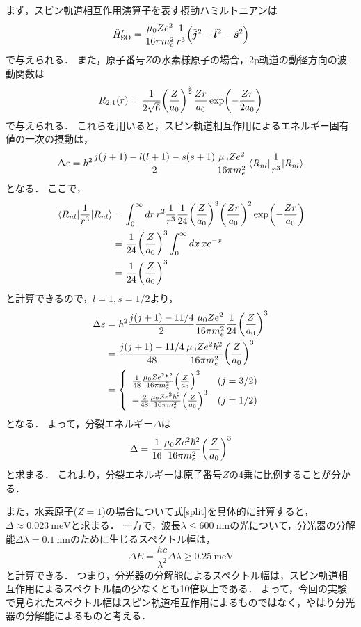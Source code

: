 \documentclass[titlepage]{jsarticle}
\begin{document}
まず，スピン軌道相互作用演算子を表す摂動ハミルトニアンは
\begin{equation}
  \hat{H}'_{\mathrm{SO}} = \frac{\mu_0 Z e^2}{16\pi m_e^2}\frac{1}{r^3} \qty(\hat{\bm{j}}^2 - \hat{\bm{l}}^2 - \hat{\bm{s}}^2)
\end{equation}
で与えられる．
また，原子番号$Z$の水素様原子の場合，2p軌道の動径方向の波動関数は
\begin{equation}
  R_{2,1}(r) = \frac{1}{2\sqrt{6}} \qty(\frac{Z}{a_0})^{\frac{3}{2}} \frac{Zr}{a_0} \exp(-\frac{Zr}{2a_0})
\end{equation}
で与えられる．
これらを用いると，スピン軌道相互作用によるエネルギー固有値の一次の摂動は，
\begin{equation}
  \Delta \varepsilon = \hbar^2 \frac{j(j+1) - l(l+1) - s(s+1)}{2} \frac{\mu_0 Z e^2}{16\pi m_e^2} \expval{\frac{1}{r^3}}{R_{nl}}
\end{equation}
となる．
ここで，
\begin{align}
  \expval{\frac{1}{r^3}}{R_{nl}} &= \int_0^\infty dr\, r^2 \frac{1}{r^3} \frac{1}{24} \qty(\frac{Z}{a_0})^3 \qty(\frac{Zr}{a_0})^2 \exp(-\frac{Zr}{a_0})\notag\\
  &= \frac{1}{24} \qty(\frac{Z}{a_0})^3 \int_0^\infty dx\, x e^{-x} \notag\\
  &= \frac{1}{24} \qty(\frac{Z}{a_0})^3 
\end{align}
と計算できるので，$l=1,s=1/2$より，
\begin{align}
  \Delta \varepsilon &= \hbar^2 \frac{j(j+1) - 11/4}{2} \frac{\mu_0 Z e^2}{16\pi m_e^2} \frac{1}{24} \qty(\frac{Z}{a_0})^3  \notag\\
  &= \frac{j(j+1) - 11/4}{48} \frac{\mu_0 Z e^2\hbar^2}{16\pi m_e^2} \qty(\frac{Z}{a_0})^3 \notag\\
  &= \left\{
  \begin{array}{ll}
    \frac{1}{48}\frac{\mu_0 Z e^2\hbar^2}{16\pi m_e^2} \qty(\frac{Z}{a_0})^3 & (j = 3/2) \\
    -\frac{2}{48}\frac{\mu_0 Z e^2\hbar^2}{16\pi m_e^2} \qty(\frac{Z}{a_0})^3 & (j = 1/2)
  \end{array}
  \right.
\end{align}
となる．
よって，分裂エネルギー$\Delta$は
\begin{equation}
  \Delta =\frac{1}{16}\frac{\mu_0 Z e^2\hbar^2}{16\pi m_e^2} \qty(\frac{Z}{a_0})^3 \label{split}
\end{equation}
と求まる．
これより，分裂エネルギーは原子番号$Z$の4乗に比例することが分かる．

また，水素原子($Z=1$)の場合について式\eqref{split}を具体的に計算すると，$\Delta \approx \SI{0.023}{\meV}$と求まる．
一方で，波長$\lambda \le \SI{600}{\nm}$の光について，分光器の分解能$\Delta \lambda = \SI{0.1}{\nm}$のために生じるスペクトル幅は，
\begin{equation}
  \Delta E = \frac{hc}{\lambda^2} \Delta\lambda \ge \SI{0.25}{\meV}
\end{equation}
と計算できる．
つまり，分光器の分解能によるスペクトル幅は，スピン軌道相互作用によるスペクトル幅の少なくとも10倍以上である．
よって，今回の実験で見られたスペクトル幅はスピン軌道相互作用によるものではなく，やはり分光器の分解能によるものと考える．
\end{document}
